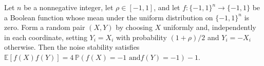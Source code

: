 \begin{theorem}
\label{FABL.noiseStability_eq_four_mul_lowerLeftProbability_sub_one}
\leanok
{}
Let $n$ be a nonnegative integer, let $\rho\in[-1,1]$, and let $f:\{-1,1\}^n\to\{-1,1\}$
be a Boolean function whose mean under the uniform distribution on $\{-1,1\}^n$ is zero.
Form a random pair $(X,Y)$ by choosing $X$ uniformly and, independently in each
coordinate, setting $Y_i=X_i$ with probability $(1+\rho)/2$ and $Y_i=-X_i$ otherwise.
Then the noise stability satisfies $\mathbb{E}[f(X)f(Y)]=4\,\mathbb{P}(f(X)=-1\text{ and
}f(Y)=-1)-1$.
\end{theorem}

